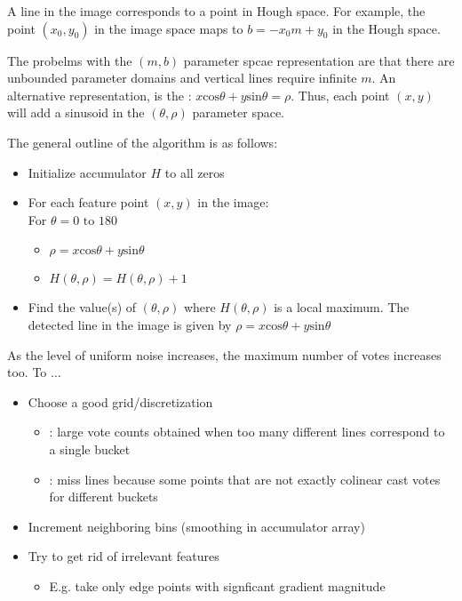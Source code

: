 \documentclass{article}
\begin{document}
\begin{remark}
  A line in the image corresponds to a point in Hough space. For example, the point $(x_0 , y_0)$ in the image space maps to $b=-x_0 m + y_0$ in the Hough space. 
\end{remark}

\begin{remark}
  The probelms with the $(m,b)$ parameter spcae representation are that there are unbounded parameter domains and vertical lines require infinite $m$. An alternative representation, is the : $x \textrm{cos}\theta + y \textrm{sin}\theta = \rho$. Thus, each point $(x,y)$ will add a sinusoid in the $(\theta, \rho)$ parameter space. 
\end{remark}

The general outline of the algorithm is as follows:
\begin{itemize}
  \item Initialize accumulator $H$ to all zeros
  \item For each feature point $(x,y)$ in the image: \\ 
    For $\theta = 0 \textrm{ to } 180$
    \begin{itemize}
      \item $\rho = x \textrm{cos}\theta + y \textrm{sin}\theta$
      \item $H(\theta , \rho) = H(\theta , \rho) + 1$
    \end{itemize}
  \item Find the value(s) of $(\theta, \rho)$ where $H(\theta, \rho)$ is a local maximum. The detected line in the image is given by $\rho = x \textrm{cos}\theta + y \textrm{sin}\theta$
\end{itemize}

As the level of uniform noise increases, the maximum number of votes increases too. To $\dots$ 
\begin{itemize}
  \item Choose a good grid/discretization 
    \begin{itemize}
      \item {}: large vote counts obtained when too many different lines correspond to a single bucket 
      \item {}: miss lines because some points that are not exactly colinear cast votes for different buckets 
    \end{itemize}
  \item Increment neighboring bins (smoothing in accumulator array)
  \item Try to get rid of irrelevant features 
    \begin{itemize}
      \item E.g. take only edge points with signficant gradient magnitude
    \end{itemize}
\end{itemize}
\end{document}
